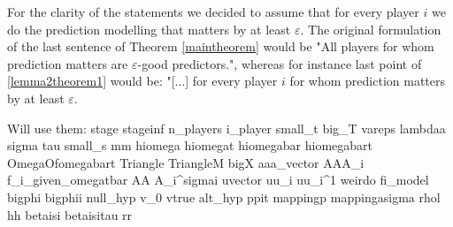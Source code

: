\documentclass[]{spie}  %
\begin{document}
For the clarity of the statements we decided to assume that for every player $i$ we do the prediction modelling that matters by at least $\varepsilon$. The original formulation of the last sentence of Theorem \autoref{maintheorem} would be "All players for whom prediction matters are $\varepsilon$-good predictors.", whereas for instance last point of \autoref{lemma2theorem1} would be: "[...] for every player $i$ for whom prediction matters by at least $\varepsilon$.

Will use them: \gls{stage} \gls{stageinf} \gls{n_players} \gls{i_player} \gls{small_t} \gls{big_T} \gls{vareps} \gls{lambdaa} \gls{sigma} \gls{tau} \gls{small_s} \gls{mm} \gls{hiomega} \gls{hiomegat} \gls{hiomegabar} \gls{hiomegabart} \gls{OmegaOfomegabart} \gls{Triangle} \gls{TriangleM} \gls{bigX} \gls{aaa_vector} \gls{AAA_i}  \gls{f_i_given_omegatbar} \gls{AA} \gls{A_i^sigmai} \gls{uvector} \gls{uu_i} \gls{uu_i^1} \gls{weirdo} \gls{fi_model} \gls{bigphi} \gls{bigphii} \gls{null_hyp} \gls{v_0} \gls{vtrue} \gls{alt_hyp} \gls{ppit} \gls{mappingp} \gls{mappingasigma} \gls{rhol} \gls{hh} \gls{betaisi} \gls{betaisitau} \gls{rr}

\begin{comment}
\begin{figure}[h]
    \centering
    \texttt{[image: songs\_visualization/numerical\_boxplots.png]}
    \caption{Box plots for statistical analysis of numerical features.}
    \label{fig:boxplots}
\end{figure}
\end{comment}
\end{document}

